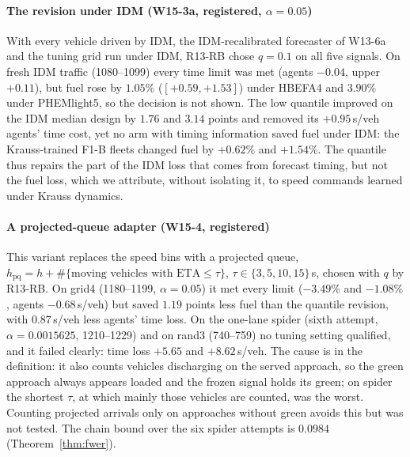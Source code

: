 \paragraph{The revision under IDM (W15-3a, registered, $\alpha=0.05$)} With every vehicle driven by IDM, the IDM-recalibrated forecaster of
W13-6a and the tuning grid run under IDM, R13-RB chose $q=0.1$ on all five signals. On fresh IDM traffic (1080--1099) every time limit was met
(agents $-0.04$, upper $+0.11$), but fuel rose by $1.05\%$ ($[+0.59,+1.53]$) under HBEFA4 and $3.90\%$ under PHEMlight5, so the decision is
not shown. The low quantile improved on the IDM median design by $1.76$ and $3.14$ points and removed its $+0.95$\,s/veh agents' time cost,
yet no arm with timing information saved fuel under IDM: the Krauss-trained F1-B fleets changed fuel by $+0.62\%$ and $+1.54\%$. The
quantile thus repairs the part of the IDM loss that comes from forecast timing, but not the fuel loss, which we attribute, without
isolating it, to speed commands learned under Krauss dynamics.
\paragraph{A projected-queue adapter (W15-4, registered)} This variant replaces the speed bins with a projected queue,
$h_{\mathrm{pq}}=h+\#\{\text{moving vehicles with ETA}\le\tau\}$, $\tau\in\{3,5,10,15\}$\,s, chosen with $q$ by R13-RB. On grid4
(1180--1199, $\alpha=0.05$) it met every limit ($-3.49\%$ and $-1.08\%$, agents $-0.68$\,s/veh) but saved $1.19$ points less fuel than the
quantile revision, with $0.87$\,s/veh less agents' time loss. On the one-lane spider (sixth attempt, $\alpha=0.0015625$, 1210--1229) and on
rand3 (740--759) no tuning setting qualified, and it failed clearly: time loss $+5.65$ and $+8.62$\,s/veh. The cause is in the definition:
it also counts vehicles discharging on the served approach, so the green approach always appears loaded and the frozen signal holds its
green; on spider the shortest $\tau$, at which mainly those vehicles are counted, was the worst. Counting projected arrivals only on
approaches without green avoids this but was not tested. The chain bound over the six spider attempts is $0.0984$ (Theorem~\ref{thm:fwer}).
